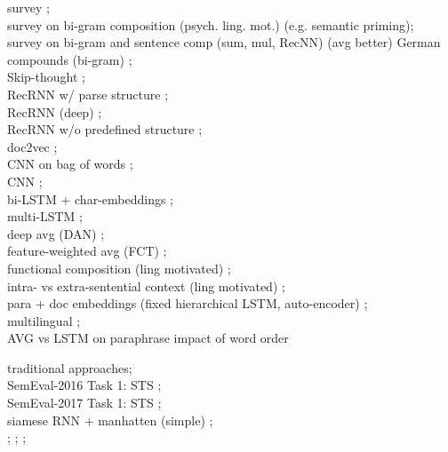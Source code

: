 survey \autocite{wang_comparison_2017}; \\
survey on bi-gram composition (psych. ling. mot.) \autocite{mitchell_composition_2010} (e.g. semantic priming); \\
survey on bi-gram and sentence comp (sum, mul, RecNN) \autocite{blacoe_comparison_2012} (avg better)
German compounds (bi-gram) \autocite{dima_reverse-engineering_2015}; \\
Skip-thought \autocite{kiros_skip-thought_2015}; \\
RecRNN w/ parse structure \autocite{socher_dynamic_2011,socher_semantic_2012,socher_recursive_2013,tai_improved_2015,wieting_paraphrase_2015}; \\ 
RecRNN (deep) \autocite{irsoy_deep_2014}; \\ 
RecRNN w/o predefined structure \autocite{zhao_self-adaptive_2015,chen_sentence_2015}; \\
doc2vec \autocite{le_distributed_2014,lau_empirical_2016}; \\ 
CNN on bag of words \autocite{kalchbrenner_convolutional_2014}; \\
CNN \autocite{kim_convolutional_2014,hu_convolutional_2014,yin_convolutional_2015,he_multi-perspective_2015}; \\
bi-LSTM + char-embeddings \autocite{ling_finding_2015}; \\
multi-LSTM \autocite{liu_multi-timescale_2015}; \\
deep avg (DAN) \autocite{iyyer_deep_2015}; \\
feature-weighted avg (FCT) \autocite{yu_learning_2015}; \\
functional composition (ling motivated) \autocite{baroni_frege_2014,paperno_practical_2014}; \\
intra- vs extra-sentential context (ling motivated) \autocite{polajnar_exploration_2015}; \\
para + doc embeddings (fixed hierarchical LSTM, auto-encoder)
\autocite{li_hierarchical_2015}; \\  
multilingual \autocite{hermann_multilingual_2014}; \\

AVG vs LSTM on paraphrase \autocite{wieting_towards_2015}
impact of word order \autocite{pham_sentence_2013}

traditional approaches; \\
SemEval-2016 Task 1: STS \autocite{agirre_semeval-2016_2016}; \\
SemEval-2017 Task 1: STS \autocite{cer_semeval-2017_2017}; \\

siamese RNN + manhatten (simple) \autocite{mueller_siamese_2016}; \\

\autocite{habernal_exploiting_2015};
\autocite{boltuzic_identifying_2015};
\autocite{misra_measuring_2016};



